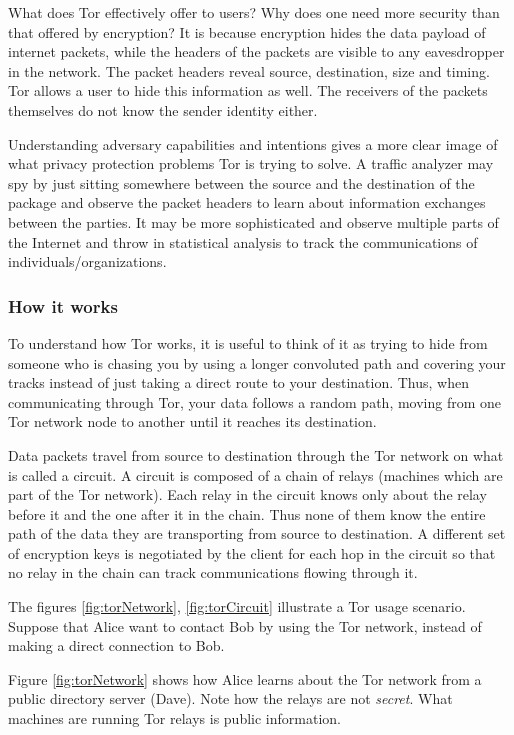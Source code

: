 \documentclass[11pt]{book} %
\begin{document}
What does Tor effectively offer to users? Why does one need more security than that offered by encryption? It is because encryption hides the data payload of internet packets, while the headers of the packets are visible to any eavesdropper in the network. The packet headers reveal source, destination, size and timing. Tor allows a user to hide this information as well. The receivers of the packets themselves do not know the sender identity either.

Understanding adversary capabilities and intentions gives a more clear image of what privacy protection problems Tor is trying to solve. A traffic analyzer may spy by just sitting somewhere between the source and the destination of the package and observe the packet headers to learn about information exchanges between the parties. It may be more sophisticated and observe multiple parts of the Internet and throw in statistical analysis to track the communications of individuals/organizations.

\subsubsection{How it works}

To understand how Tor works, it is useful to think of it as trying to hide from someone who is chasing you by using a longer convoluted path and covering your tracks instead of just taking a direct route to your destination. Thus, when communicating through Tor, your data follows a random path, moving from one Tor network node to another until it reaches its destination.

Data packets travel from source to destination through the Tor network on what is called a circuit. A circuit is composed of a chain of relays (machines which are part of the Tor network). Each relay in the circuit knows only about the relay before it and the one after it in the chain. Thus none of them know the entire path of the data they are transporting from source to destination. A different set of encryption keys is negotiated by the client for each hop in the circuit so that no relay in the chain can track communications flowing through it. \citep*{web:torOverview}

The figures \ref{fig:torNetwork}, \ref{fig:torCircuit} illustrate a Tor usage scenario. Suppose that Alice want to contact Bob by using the Tor network, instead of making a direct connection to Bob.

Figure \ref{fig:torNetwork} shows how Alice learns about the Tor network from a public directory server (Dave). Note how the relays are not \textit{secret}. What machines are running Tor relays is public information.
\end{document}
